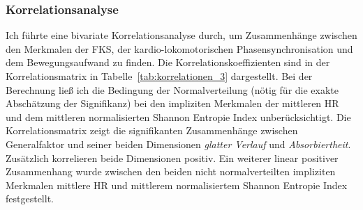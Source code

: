 \label{sub:ergebnisse_5_3}

\subsubsection{Korrelationsanalyse} 

\label{ssub:korrelationsanalyse_5_3}

Ich führte eine bivariate Korrelationsanalyse durch, um Zusammenhänge zwischen den Merkmalen der \ac{FKS}, der kardio-lokomotorischen Phasensynchronisation und dem Bewegungsaufwand zu finden. Die Korrelationskoeffizienten sind in der Korrelationsmatrix in Tabelle~\ref{tab:korrelationen_3} dargestellt. Bei der Berechnung ließ ich die Bedingung der Normalverteilung (nötig für die exakte Abschätzung der Signifikanz) bei den impliziten Merkmalen der mittleren \ac{HR} und dem mittleren normalisierten Shannon Entropie Index unberücksichtigt. Die Korrelationsmatrix zeigt die signifikanten Zusammenhänge zwischen Generalfaktor und seiner beiden Dimensionen \emph{glatter Verlauf} und \emph{Absorbiertheit}. Zusätzlich korrelieren beide Dimensionen positiv. Ein weiterer linear positiver Zusammenhang wurde zwischen den beiden nicht normalverteilten impliziten Merkmalen mittlere \ac{HR} und mittlerem normalisiertem Shannon Entropie Index festgestellt.

